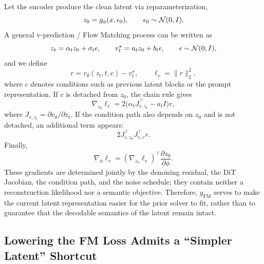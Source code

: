 Let the encoder produce the clean latent via reparameterization,
\begin{equation}
    z_0=g_\phi(x,\epsilon_0),
    \qquad
    \epsilon_0\sim\mathcal{N}(0,I).
    \label{eq:app-hack-z0}
\end{equation}
A general v-prediction / Flow Matching process can be written as
\begin{equation}
    z_t=\alpha_tz_0+\sigma_t\epsilon,
    \qquad
    v_t^\star=a_tz_0+b_t\epsilon,
    \qquad
    \epsilon\sim\mathcal{N}(0,I),
    \label{eq:app-hack-forward}
\end{equation}
and we define
\begin{equation}
    r
    =
    v_\theta(z_t,t,c)-v_t^\star,
    \qquad
    \ell_v=\|r\|_2^2,
    \label{eq:app-hack-residual}
\end{equation}
where $c$ denotes conditions such as previous latent blocks or the prompt representation. If $c$ is detached from $z_0$, the chain rule gives
\begin{equation}
    \nabla_{z_0}\ell_v
    =
    2\big(\alpha_tJ_{v,z_t}^{\top}-a_tI\big)r,
    \label{eq:app-hack-zgrad}
\end{equation}
where $J_{v,z_t}=\partial v_\theta/\partial z_t$. If the condition path also depends on $z_0$ and is not detached, an additional term appears:
\begin{equation}
    2J_{c,z_0}^{\top}J_{v,c}^{\top}r.
    \label{eq:app-hack-condgrad}
\end{equation}
Finally,
\begin{equation}
    \nabla_\phi\ell_v
    =
    \left(\nabla_{z_0}\ell_v\right)^{\top}
    \frac{\partial z_0}{\partial\phi}.
    \label{eq:app-hack-phigrad}
\end{equation}
These gradients are determined jointly by the denoising residual, the DiT Jacobian, the condition path, and the noise schedule; they contain neither a reconstruction likelihood nor a semantic objective. Therefore, $g_{\mathrm{FM}}$ serves to make the current latent representation easier for the prior solver to fit, rather than to guarantee that the decodable semantics of the latent remain intact.

\subsection{Lowering the FM Loss Admits a ``Simpler Latent'' Shortcut}

